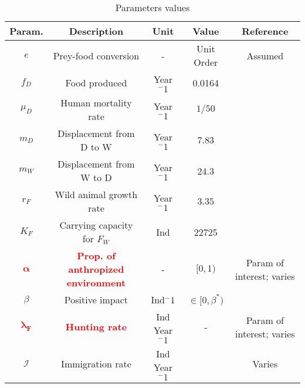\documentclass{article}
\newcommand{\lfw}{\lambda_{F}}
\begin{document}
\begin{table}[ht]
\centering
\begin{tabular}{|c|c|c|c|c|}
\hline 
Param. & Description & Unit & Value & Reference \\ 
\hline 
$e$ & Prey-food conversion &- & Unit Order & Assumed\\
$f_D$ & Food produced&  Year$^-1$ &0.0164 & \cite{koppert_consommation_1996}\\
$\mu_D$ & Human mortality rate& Year$^-1$  & $1/50$ & \cite{ins_demographie}\\
$m_D$ & Displacement from D to W &Year$^-1$  &$7.83$ & \cite{avila_interpreting_2019}\\
$m_W$ &Displacement from W to D  &Year$^-1$  &24.3 & \cite{avila_interpreting_2019}\\
$r_F$ & Wild animal growth rate& Year$^-1$ & $3.35$ & \cite{robinson_intrinsic_1986}\\
$K_F$ & Carrying capacity for $F_W$ & Ind& 22725 & \cite{janson_ecological_1990} \\
\textcolor{red}{$\bm{\alpha}$}  & \textcolor{red}{\textbf{Prop. of anthropized environment}} &-&  $[0, 1)$ & Param of interest; varies \\
$\beta$ & Positive impact& Ind$^-1$ & $\in [0, \beta^*)$ &  \\
\textcolor{red}{$\bm{\lfw}$} & \textcolor{red}{\textbf{Hunting rate}} & Ind Year$^-1$ & - & Param of interest; varies \\
$\mathcal{I}$ &  Immigration rate& Ind Year$^-1$ & & Varies \\
\hline
\end{tabular}

\caption{Parameters values}
\end{table}


%
\end{document}
